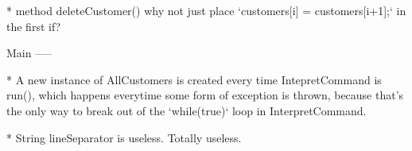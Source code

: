 * method deleteCustomer() 
why not just place `customers[i] = customers[i+1];` in the first if? 

Main
-----

* A new instance of AllCustomers is created every time IntepretCommand is run(), which happens everytime some form of exception is thrown, because that's the only way to break out of the `while(true)` loop in InterpretCommand. 

* String lineSeparator is useless. Totally useless.
